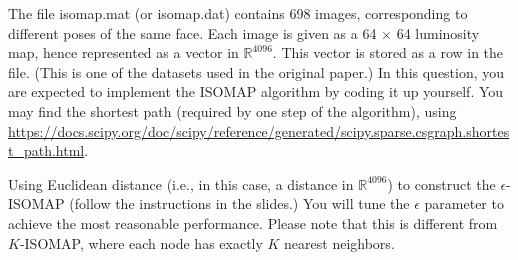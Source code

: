 \documentclass[twoside,10pt]{article}
\begin{document}
The file \textsf{isomap.mat} (or \textsf{isomap.dat}) contains 698 images, corresponding to different poses of the same face. Each image is given as a 64 $\times$ 64 luminosity map, hence represented as a vector in $\mathbb R^{4096}$. This vector is stored as a row in the file. (This is one of the datasets used in the original paper.) In this question, you are expected to implement the ISOMAP algorithm by coding it up yourself. You may find the shortest path (required by one step of the algorithm), using \url{https://docs.scipy.org/doc/scipy/reference/generated/scipy.sparse.csgraph.shortest_path.html}. 


Using Euclidean distance (i.e., in this case, a distance in $\mathbb R^{4096}$) to construct the $\epsilon$-ISOMAP (follow the instructions in the slides.) You will tune the $\epsilon$ parameter to achieve the most reasonable performance. Please note that this is different from $K$-ISOMAP, where each node has exactly $K$ nearest neighbors.
\end{document}
